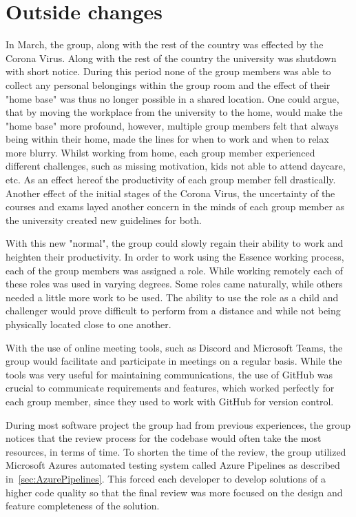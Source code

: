 \section{Outside changes}
In March, the group, along with the rest of the country was effected by the Corona Virus.
Along with the rest of the country the university was shutdown with short notice.
During this period none of the group members was able to collect any personal belongings within the group room and the effect of their "home base" was thus no longer possible in a shared location.
One could argue, that by moving the workplace from the university to the home, would make the "home base" more profound, however, multiple group members felt that always being within their home, made the lines for when to work and when to relax more blurry.
Whilst working from home, each group member experienced different challenges, such as missing motivation, kids not able to attend daycare, etc.
As an effect hereof the productivity of each group member fell drastically.
Another effect of the initial stages of the Corona Virus, the uncertainty of the courses and exams layed another concern in the minds of each group member as the university created new guidelines for both.

With this new "normal", the group could slowly regain their ability to work and heighten their productivity.
In order to work using the Essence working process, each of the group members was assigned a role.
While working remotely each of these roles was used in varying degrees.
Some roles came naturally, while others needed a little more work to be used.
The ability to use the role as a child and challenger would prove difficult to perform from a distance and while not being physically located close to one another. 

With the use of online meeting tools, such as Discord and Microsoft Teams, the group would facilitate and participate in meetings on a regular basis.
While the tools was very useful for maintaining communications, the use of GitHub was crucial to communicate requirements and features, which worked perfectly for each group member, since they used to work with GitHub for version control.

During most software project the group had from previous experiences, the group notices that the review process for the codebase would often take the most resources, in terms of time.
To shorten the time of the review, the group utilized Microsoft Azures automated testing system called Azure Pipelines as described in~\autoref{sec:AzurePipelines}.
This forced each developer to develop solutions of a higher code quality so that the final review was more focused on the design and feature completeness of the solution.
